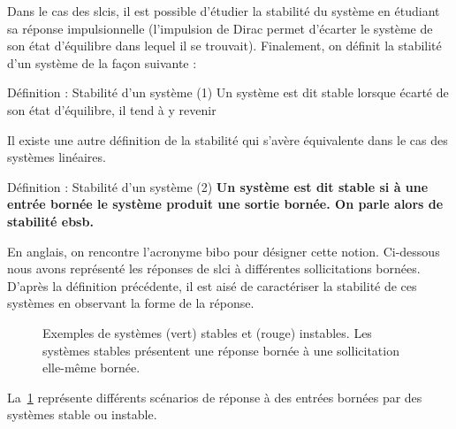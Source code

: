 Dans le cas des \glspl{slci}, il est possible d'étudier la stabilité du système 
en étudiant sa réponse impulsionnelle (l'impulsion de Dirac permet d'écarter 
le système de son état d'équilibre dans lequel il se trouvait). 
Finalement, on définit la stabilité d'un système de la façon 
suivante :
\begin{definition}{Définition : Stabilité d'un système (1)}
Un système est dit stable lorsque écarté de son état d'équilibre, il 
tend à y revenir
\end{definition}
Il existe une autre définition de la stabilité qui s'avère équivalente 
dans le cas des systèmes linéaires.
\begin{definition}{Définition : Stabilité d'un système (2)}
\textbf{Un système est dit stable si à une entrée bornée le système produit 
une sortie bornée. On parle alors de stabilité \gls{ebsb}.}
\end{definition}
En anglais, on rencontre l'acronyme \gls{bibo} pour désigner cette notion.
Ci-dessous nous avons représenté les réponses de \gls{slci} à différentes
sollicitations bornées. D'après la définition précédente, il est aisé
de caractériser la stabilité de ces systèmes en observant la forme de la 
réponse.
\begin{figure}[!t]
    \centering
    
    \caption{Exemples de systèmes (vert) stables et (rouge) instables. Les 
    systèmes stables présentent une réponse bornée à une sollicitation elle-même
    bornée.\label{fig-bibo}}
\end{figure}
La~\cref{fig-bibo} représente différents scénarios de réponse à des entrées 
bornées par des systèmes stable ou instable.
\newpage
